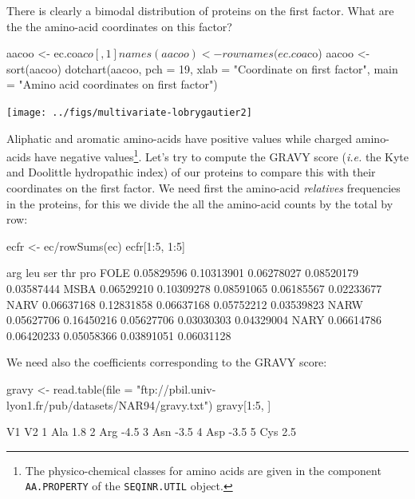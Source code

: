 \documentclass{article}
\begin{document}
There is clearly a bimodal distribution of proteins on the first factor. What are the
the amino-acid coordinates on this factor?

\begin{Schunk}
\begin{Sinput}
 aacoo <- ec.coa$co[, 1]
 names(aacoo) <- rownames(ec.coa$co)
 aacoo <- sort(aacoo)
 dotchart(aacoo, pch = 19, xlab = "Coordinate on first factor", 
     main = "Amino acid coordinates on first factor")
\end{Sinput}
\end{Schunk}
\texttt{[image: ../figs/multivariate-lobrygautier2]}

Aliphatic and aromatic amino-acids have positive values while charged amino-acids
have negative values\footnote{The physico-chemical classes for amino acids are
given in the component \texttt{AA.PROPERTY} of the \texttt{SEQINR.UTIL}
object.}. Let's try to compute the GRAVY score (\textit{i.e.} the Kyte and Doolittle 
hydropathic index\cite{KD}) of our proteins to compare this with their coordinates 
on the first factor. We need first the amino-acid \emph{relatives} frequencies in the
proteins, for this we divide the all the amino-acid counts by the total by row:

\begin{Schunk}
\begin{Sinput}
 ecfr <- ec/rowSums(ec)
 ecfr[1:5, 1:5]
\end{Sinput}
\begin{Soutput}
            arg        leu        ser        thr        pro
FOLE 0.05829596 0.10313901 0.06278027 0.08520179 0.03587444
MSBA 0.06529210 0.10309278 0.08591065 0.06185567 0.02233677
NARV 0.06637168 0.12831858 0.06637168 0.05752212 0.03539823
NARW 0.05627706 0.16450216 0.05627706 0.03030303 0.04329004
NARY 0.06614786 0.06420233 0.05058366 0.03891051 0.06031128
\end{Soutput}
\end{Schunk}

We need also the coefficients corresponding to the GRAVY score:

\begin{Schunk}
\begin{Sinput}
 gravy <- read.table(file = "ftp://pbil.univ-lyon1.fr/pub/datasets/NAR94/gravy.txt")
 gravy[1:5, ]
\end{Sinput}
\begin{Soutput}
   V1   V2
1 Ala  1.8
2 Arg -4.5
3 Asn -3.5
4 Asp -3.5
5 Cys  2.5
\end{Soutput}
\end{Schunk}
\end{document}
